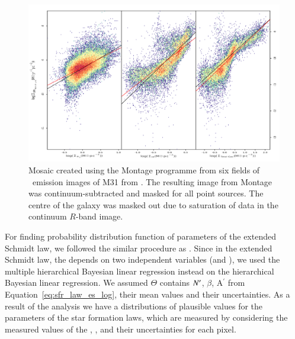 \begin{figure}
\centering
\includegraphics[width=164mm]{../image_paper1/OLS_vs_bayes.png.pdf}
\caption[]{Mosaic created using the Montage programme from six fields of \halpha\ emission images of M31 from \citet{Massey07}. The resulting image from Montage was continuum-subtracted and masked for all point sources. The centre of the galaxy was masked out due to saturation of data in the continuum $R$-band image.}
\label{fig:halpha}
\end{figure}

For finding probability distribution function of parameters of the extended Schmidt law, we followed the similar procedure as \cite{Shetty13}.
Since in the extended Schmidt law, the \sigmasfr depends on two independent variables (\sigmagas and \sigmastar), we used the multiple hierarchical Bayesian linear regression instead on the hierarchical Bayesian linear regression.
We assumed $\Theta$ contains $N^\prime$, $\beta$, A$^\prime$ from Equation~\ref{eq:sfr_law_es_log}, their mean values and their uncertainties. 
As a result of the analysis we have a distributions of plausible values for the parameters of the star formation laws, which are measured by considering the measured values of the \sigmagas, \sigmasfr, \sigmastar and their uncertainties for each pixel.



